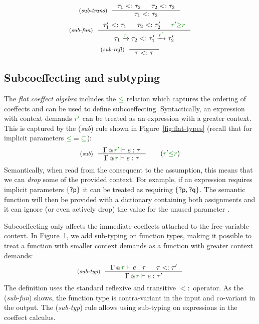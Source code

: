 \begin{figure}[t]
\begin{equation*}
\tyrule{sub-trans}
  { \tau_1 <: \tau_2 & \tau_2 <: \tau_3 }
  { \tau_1 <: \tau_3  }
\end{equation*}
\begin{equation*}
\tyrule{sub-fun}
  { \tau_1' <: \tau_1 & \tau_2 <: \tau_2' & \cclrd{r'} \cgeq \cclrd{r} }
  { \tau_1 \xrightarrow{\cclrd{r}} \tau_2 <: \tau_1' \xrightarrow{\cclrd{r'}} \tau_2' }
\end{equation*}
\begin{equation*}
\tyrule{sub-refl}
  { }
  { \tau <: \tau }
\end{equation*}

\label{fig:flat-types-sub}
\end{figure}


\subsection{Subcoeffecting and subtyping}
\label{sec:flat-exts-sub}

The \emph{flat coeffect algebra} includes the $\cleq$ relation which captures the ordering of
coeffects and can be used to define subcoeffecting. Syntactically, an expression with context
demands $\cclrd{r'}$ can be treated as an expression with a greater context. This is captured
by the (\emph{sub}) rule shown in Figure~\ref{fig:flat-types} (recall that for implicit
parameters $\cleq = \cclrd{\subseteq}$):
%
\begin{equation*}
\tyrule{sub}
  {\coctx{\Gamma}{\cclrd{r'}} \vdash e : \tau }
  {\coctx{\Gamma}{\cclrd{r}} \vdash e : \tau }\quad\quad(\cclrd{r'} \cleq \cclrd{r})
\end{equation*}
%
Semantically, when read from the consequent to the assumption, this means that we can \emph{drop}
some of the provided context. For example, if an expression requires implicit parameters
$\{ \textnormal{\sffamily ?p} \}$ it can be treated as requiring $\{ \textnormal{\sffamily ?p}, \textnormal{\sffamily ?q} \}$. The semantic
function will then be provided with a dictionary containing both assignments and it can ignore
(or even actively drop) the value for the unused parameter .

Subcoeffecting only affects the immediate coeffects attached to the free-variable context.
In Figure~\ref{fig:flat-types-sub}, we add sub-typing on function types, making it possible to treat
a function with smaller context demands as a function with greater context demands:
%
\begin{equation*}
\tyrule{sub-typ}
  { \coctx{\Gamma}{\cclrd{r}} \vdash e : \tau & \tau <: \tau' }
  { \coctx{\Gamma}{\cclrd{r}} \vdash e : \tau' }
\end{equation*}
%
The definition uses the standard reflexive and transitive $<:$ operator. As the (\emph{sub-fun})
shows, the function type is contra-variant in the input and co-variant in the output. The
(\emph{sub-typ}) rule allows using sub-typing on expressions in the coeffect calculus.

